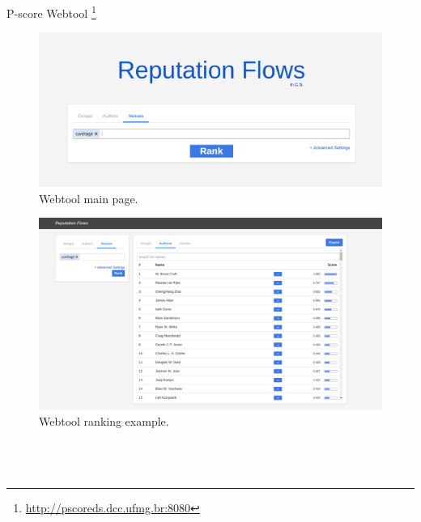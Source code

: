 \documentclass[msc]{ppgccufmg}
\begin{document}
\begin{appendices}
P-score Webtool \footnote{\url{http://pscoreds.dcc.ufmg.br:8080}}

\begin{figure}[h]
    \centering
    \includegraphics[width=\linewidth]{fig/webtool-main}
    \caption{Webtool main page.}
    \label{fig:exemplo}
\end{figure}

\begin{figure}[h]
    \centering
    \includegraphics[width=\linewidth]{fig/webtool}
    \caption{Webtool ranking example.}
    \label{fig:exemplo}
\end{figure}


\chapter*{}
\ \\

\end{appendices}	
\end{document}
